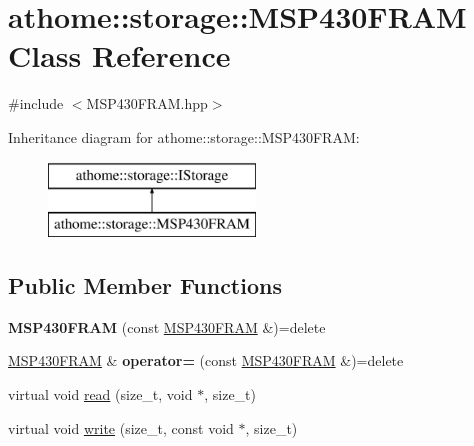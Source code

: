 \hypertarget{classathome_1_1storage_1_1_m_s_p430_f_r_a_m}{}\section{athome\+:\+:storage\+:\+:M\+S\+P430\+F\+R\+AM Class Reference}
\label{classathome_1_1storage_1_1_m_s_p430_f_r_a_m}


{\ttfamily \#include $<$M\+S\+P430\+F\+R\+A\+M.\+hpp$>$}

Inheritance diagram for athome\+:\+:storage\+:\+:M\+S\+P430\+F\+R\+AM\+:\begin{figure}[H]
\begin{center}
\leavevmode
\includegraphics[height=2.000000cm]{classathome_1_1storage_1_1_m_s_p430_f_r_a_m}
\end{center}
\end{figure}
\subsection*{Public Member Functions}
\begin{DoxyCompactItemize}
\item 
\mbox{\label{classathome_1_1storage_1_1_m_s_p430_f_r_a_m_a4537357b5eb4195cff71461bb8f97300}} 
{\bfseries M\+S\+P430\+F\+R\+AM} (const \mbox{\hyperlink{classathome_1_1storage_1_1_m_s_p430_f_r_a_m}{M\+S\+P430\+F\+R\+AM}} \&)=delete
\item 
\mbox{\label{classathome_1_1storage_1_1_m_s_p430_f_r_a_m_aa6bceeda133dc8e69af41ec1c86811c5}} 
\mbox{\hyperlink{classathome_1_1storage_1_1_m_s_p430_f_r_a_m}{M\+S\+P430\+F\+R\+AM}} \& {\bfseries operator=} (const \mbox{\hyperlink{classathome_1_1storage_1_1_m_s_p430_f_r_a_m}{M\+S\+P430\+F\+R\+AM}} \&)=delete
\item 
virtual void \mbox{\hyperlink{classathome_1_1storage_1_1_m_s_p430_f_r_a_m_a3a00a26565491d08d26f505930453fb7}{read}} (size\+\_\+t, void $\ast$, size\+\_\+t)
\item 
virtual void \mbox{\hyperlink{classathome_1_1storage_1_1_m_s_p430_f_r_a_m_ae6b7a6d178233f9e54394360b34c3bca}{write}} (size\+\_\+t, const void $\ast$, size\+\_\+t)
\end{DoxyCompactItemize}

